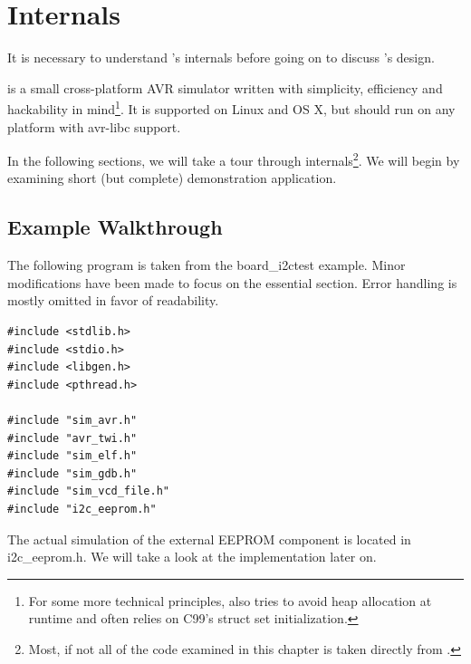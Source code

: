 
\chapter{\simavr Internals} \label{chapter:simavr}

It is necessary to understand \simavr's internals before going on to discuss
\qsimavr's design.

\simavr is a small cross-platform \ac{AVR} simulator written with simplicity, efficiency and
hackability in mind\footnote{
%
For some more technical principles, \simavr also tries to avoid heap allocation
at runtime and often relies on C99's struct set initialization.
%
}. It is supported on Linux and OS X, but should run on any
platform with avr-libc support.

In the following sections, we will take a tour through \simavr internals\footnote{
Most, if not all of the code examined in this chapter is taken directly from \simavr.}.
We will begin by examining short (but complete) demonstration application.


\section{\simavr Example Walkthrough} \label{section:simavr_example_walkthrough}

The following program is taken from the board\_i2ctest \simavr example. Minor
modifications have been made to focus on the essential section. Error handling
is mostly omitted in favor of readability.

\begin{lstlisting}
#include <stdlib.h>
#include <stdio.h>
#include <libgen.h>
#include <pthread.h>

#include "sim_avr.h"
#include "avr_twi.h"
#include "sim_elf.h"
#include "sim_gdb.h"
#include "sim_vcd_file.h"
#include "i2c_eeprom.h"
\end{lstlisting}

The actual simulation of the external \ac{EEPROM} component is located in
i2c\_eeprom.h. We will take a look at the implementation later on.

